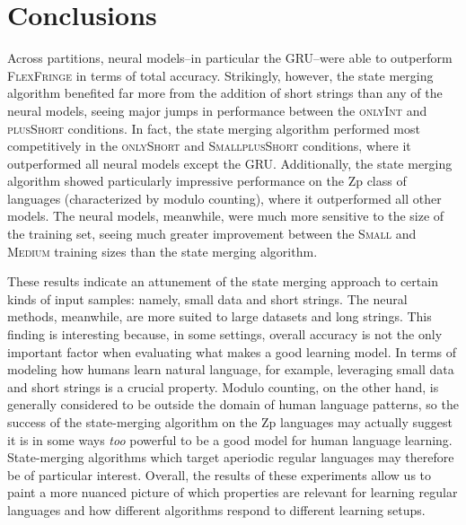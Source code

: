 \documentclass[twoside,11pt]{article}
\newcommand{\tscx}[1]{\textsc{#1}\xspace}
\newcommand{\sm}{\tscx{Small}}
\newcommand{\med}{\tscx{Medium}}
\newcommand{\onlyShort}{\tscx{onlyShort}}
\newcommand{\plusShort}{\tscx{plusShort}}
\newcommand{\onlyInt}{\tscx{onlyInt}}
\begin{document}

\section{Conclusions}  \label{sec:conclusion}
Across partitions, neural models--in particular the GRU--were able to outperform \textsc{FlexFringe} in terms of total accuracy.
Strikingly, however, the state merging algorithm benefited far more from the addition of short strings than any of the neural models, seeing major jumps in performance between the \onlyInt and \plusShort conditions.
In fact, the state merging algorithm performed most competitively in the \onlyShort and \sm \plusShort conditions, where it outperformed all neural models except the GRU.
Additionally, the state merging algorithm showed particularly impressive performance on the Zp class of languages (characterized by modulo counting), where it outperformed all other models.
The neural models, meanwhile, were much more sensitive to the size of the training set, seeing much greater improvement between the \sm and \med training sizes than the state merging algorithm.

These results indicate an attunement of the state merging approach to certain kinds of input samples: namely, small data and short strings.
The neural methods, meanwhile, are more suited to large datasets and long strings.
This finding is interesting because, in some settings, overall accuracy is not the only important factor when evaluating what makes a good learning model.
In terms of modeling how humans learn natural language, for example, leveraging small data and short strings is a crucial property.
Modulo counting, on the other hand, is generally considered to be outside the domain of human language patterns, so the success of the state-merging algorithm on the Zp languages may actually suggest it is in some ways \emph{too} powerful to be a good model for human language learning.
State-merging algorithms which target aperiodic regular languages may therefore be of particular interest.
Overall, the results of these experiments allow us to paint a more nuanced picture of which properties are relevant for learning regular languages and how different algorithms respond to different learning setups.
\end{document}
